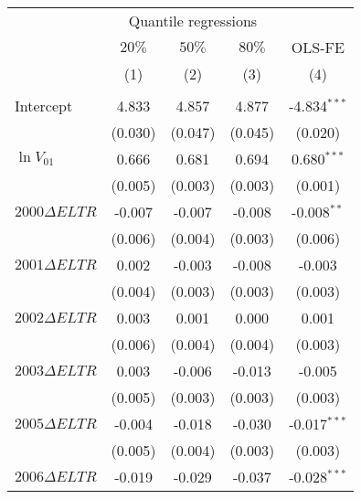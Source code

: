 \begin{table}[H]
  \centering
  \begin{tabular}{@{}lcccc@{}}
  \toprule
                         & \multicolumn{3}{c}{Quantile regressions} &           \\ \cmidrule(lr){2-4}
                         & $20\%$       & $50\%$      & $80\%$      & OLS-FE    \\
                         & (1)          & (2)         & (3)         & (4)       \\ \midrule
  \multicolumn{5}{l}{}                                                          \\
  Intercept             &  4.833\sym{***}   &  4.857\sym{***}   & 4.877\sym{***}  & -4.834$^{***}$ \\
                        & (0.030)           & (0.047)           & (0.045)         & (0.020) \\
  $\ln{V}_{01}$         & 0.666\sym{***}    &  0.681\sym{***}   & 0.694\sym{***}   & 0.680$^{***}$ \\
                        & (0.005)           & (0.003)             & (0.003)         & (0.001) \\
 $2000\Delta ELTR$      & -0.007            & -0.007\sym{**}    & -0.008\sym{**}  & -0.008$^{**}$ \\
                        & (0.006)           & (0.004)           & (0.003)         & (0.006) \\
 $2001\Delta ELTR$      & 0.002             & -0.003            & -0.008\sym{***} & -0.003 \\
                        & (0.004)           & (0.003)           & (0.003)        & (0.003) \\
 $2002\Delta ELTR$      & 0.003             & 0.001             & 0.000         & 0.001 \\
                        & (0.006)           & (0.004)           & (0.004)         & (0.003) \\
 $2003\Delta ELTR$      & 0.003             & -0.006\sym{*}   &-0.013\sym{***}  & -0.005 \\
                        & (0.005)           & (0.003)           & (0.003)         & (0.003) \\
 $2005\Delta ELTR$      & -0.004            & -0.018\sym{***}   & -0.030\sym{***} & -0.017$^{***}$ \\
                        & (0.005)           & (0.004)           & (0.003)         & (0.003) \\
 $2006\Delta ELTR$      & -0.019\sym{***}    & -0.029\sym{***}  &  -0.037\sym{***} & -0.028$^{***}$ \\

\end{tabular}
\end{table}

